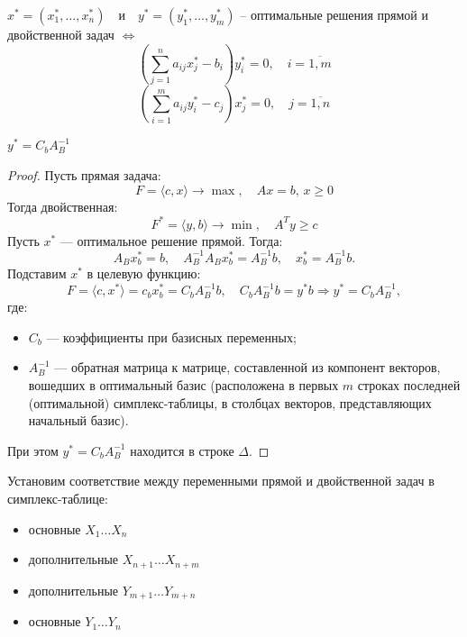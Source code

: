 \documentclass[17pt]{extarticle}
\begin{document}
\begin{theorem}
    $x^* = (x_1^*, \ldots, x_n^*) \quad \text{и} \quad y^* = (y_1^*, \ldots, y_m^*)$ -- оптимальные решения прямой и двойственной задач $\iff$
    \[
        \left( \sum_{j=1}^n a_{ij} x_j^* - b_i \right) y_i^* = 0, \quad i = \overline{1, m}
    \]
    \[
        \left( \sum_{i=1}^m a_{ij} y_i^* - c_j \right) x_j^* = 0, \quad j = \overline{1, n}
    \]
\end{theorem}

\begin{theorem}
    \( y^* = C_b A_B^{-1} \)
\end{theorem}

\begin{proof}
    Пусть прямая задача:
    \[
        F = \langle c, x \rangle \rightarrow \max, \quad Ax = b, \, x \geq 0
    \]
    Тогда двойственная:
    \[
        F^* = \langle y, b \rangle \rightarrow \min, \quad A^T y \geq c
    \]
    Пусть \( x^* \) — оптимальное решение прямой. Тогда:
    \[
        A_B x_b^* = b, \quad A_B^{-1} A_B x_b^* = A_B^{-1} b, \quad x_b^* = A_B^{-1} b.
    \]
    Подставим \( x^* \) в целевую функцию:
    \[
        F = \langle c, x^* \rangle = c_b x_b^* = C_b A_B^{-1} b, \quad C_b A_B^{-1} b = y^* b \Rightarrow y^* = C_b A_B^{-1},
    \]
    где:
    \begin{itemize}
        \item \( C_b \) — коэффициенты при базисных переменных;
        \item \( A_B^{-1} \) — обратная матрица к матрице, составленной из компонент векторов, вошедших в оптимальный базис (расположена в первых \( m \) строках последней (оптимальной) симплекс-таблицы, в столбцах векторов, представляющих начальный базис).
    \end{itemize}

    При этом \( y^* = C_b A_B^{-1} \) находится в строке \( \Delta \).
\end{proof}
Установим соответствие между переменными прямой и двойственной задач в симплекс-таблице:
\begin{itemize}
    \item основные $X_1 \ldots X_n$
    \item дополнительные $X_{n+1} \ldots X_{n+m}$
\end{itemize}
\begin{itemize}
    \item дополнительные $Y_{m+1} \ldots Y_{m+n}$
    \item основные $Y_1 \ldots Y_n$
\end{itemize}
\end{document}
